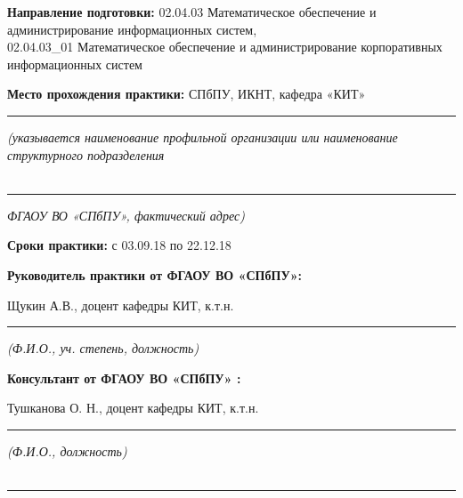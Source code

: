\documentclass[12pt,a4paper]{extreport}
\begin{document}
	\begin{flushleft}
	
		\begin{spacing}{1.2}
			\textbf{Направление подготовки:} 
			{\large
				02.04.03 Математическое обеспечение и администрирование информационных систем, \\
				02.04.03\_01 Математическое обеспечение и администрирование корпоративных информационных систем
%
			}
		\end{spacing}
		\vspace{6pt}
			
		\textbf{Место прохождения практики:} {\large
			СПбПУ, ИКНТ, кафедра «КИТ»
%
		}
		\hrule
		\textit{\centering \footnotesize (указывается наименование профильной организации или наименование структурного подразделения\\}
		\,
%
		\hrule
		\vspace{0.5mm}
		\textit{\footnotesize {\centering ФГАОУ ВО «СПбПУ», фактический адрес)\\}}
		\vspace{10pt}
		
		\textbf{Сроки практики:} {\large 
			с 03.09.18 по 22.12.18
%
		}
		\vspace{10pt}
		
		\textbf{Руководитель практики от ФГАОУ ВО «СПбПУ»:} \\
		{\centering
			{\large
				Щукин А.В., доцент кафедры КИТ, к.т.н.
%
				\\
			}\hrule\vspace{0.5mm}
			{\footnotesize \textit{(Ф.И.О., уч. степень, должность)} \\}
		}
		\vspace{10pt}
		
		\textbf{
			Консультант от ФГАОУ ВО «СПбПУ»
%
			:}\\
		{\centering
			Тушканова О. Н., доцент кафедры КИТ, к.т.н.
%
			\hrule\vspace{0.5mm}
			{\footnotesize \textit{(Ф.И.О., должность)}}\\
			\,\hrule
		}
		\vspace{15pt}
		

\end{flushleft}
\end{document}
